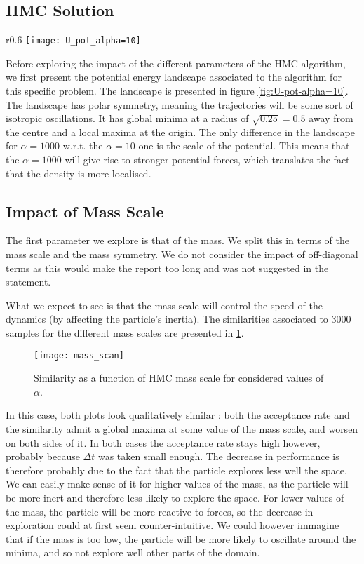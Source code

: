 \documentclass[a4paper, 12pt,oneside]{article}
\begin{document}
		\subsection{HMC Solution}
			\begin{wrapfigure}[18]{r}{0.6\textwidth}
				\centering
					\vspace{-2em}
					\texttt{[image: U\_pot\_alpha=10]}
					\caption{Potential energy landscape associated to HMC algorithm for $\alpha=10$. Version for $\alpha=1000$ is identical, except scales are scaled by a factor of 100.}
					\label{fig:U-pot-alpha=10}
			\end{wrapfigure}
			Before exploring the impact of the different parameters of the HMC algorithm, we first present the potential energy landscape associated to the algorithm for this specific problem. The landscape is presented in figure \ref{fig:U-pot-alpha=10}. 
			The landscape has polar symmetry, meaning the trajectories will be some sort of isotropic oscillations. It has global minima at a radius of $\sqrt{0.25}=0.5$ away from the centre and a local maxima at the origin. The only difference in the landscape for $\alpha=1000$ w.r.t. the $\alpha=10$ one is the scale of the potential. This means that the $\alpha=1000$ will give rise to stronger potential forces, which translates the fact that the density is more localised. 
			\subsection{Impact of Mass Scale}
			The first parameter we explore is that of the mass. We split this in terms of the mass scale and the mass symmetry. We do not consider the impact of off-diagonal terms as this would make the report too long and was not suggested in the statement. 

			What we expect to see is that the mass scale will control the speed of the dynamics (by affecting the particle's inertia).
			The similarities associated to 3000 samples for the different mass scales are presented in \ref{fig:mass-scan}.
			\begin{figure}[htb]
				\centering
					\vspace{0em}
					\texttt{[image: mass\_scan]}
					\caption{Similarity as a function of HMC mass scale for considered values of $\alpha$.}
					\label{fig:mass-scan}
			\end{figure}
			In this case, both plots look qualitatively similar : both the acceptance rate and the similarity admit a global maxima at some value of the mass scale, and worsen on both sides of it. In both cases the acceptance rate stays high however, probably because $\Delta t$ was taken small enough. The decrease in performance is therefore probably due to the fact that the particle explores less well the space. We can easily make sense of it for higher values of the mass, as the particle will be more inert and therefore less likely to explore the space. For lower values of the mass, the particle will be more reactive to forces, so the decrease in exploration could at first seem counter-intuitive. We could however immagine that if the mass is too low, the particle will be more likely to oscillate around the minima, and so not explore well other parts of the domain.
			
\end{document}
